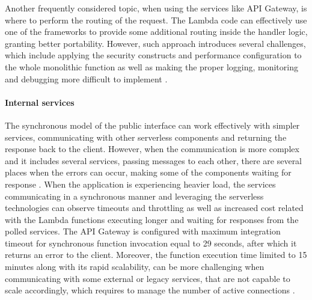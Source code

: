 Another frequently considered topic, when using the services like API Gateway, is where to perform the routing of the request.
The Lambda code can effectively use one of the frameworks to provide some additional routing inside the handler logic, granting better portability.
However, such approach introduces several challenges, which include applying the security constructs and performance configuration to the whole monolithic function as well as making the proper logging, monitoring and debugging more difficult to implement \cite{AWSReinventBuildingMicroservicesWithAWSLambda}.

\paragraph{Internal services} \label{chapter:interal-services}

The synchronous model of the public interface can work effectively with simpler services, communicating with other serverless components and returning the response back to the client.
However, when the communication is more complex and it includes several services, passing messages to each other, there are several places when the errors can occur, making some of the components waiting for response \cite{AWSReinventBuildingMicroservicesWithAWSLambda}.
When the application is experiencing heavier load, the services communicating in a synchronous manner and leveraging the serverless technologies can observe timeouts and throttling as well as increased cost related with the Lambda functions executing longer and waiting for responses from the polled services.
The API Gateway is configured with maximum integration timeout for synchronous function invocation equal to 29 seconds, after which it returns an error to the client.
Moreover, the function execution time limited to 15 minutes along with its rapid scalability, can be more challenging when communicating with some external or legacy services, that are not capable to scale accordingly, which requires to manage the number of active connections \cite{ServerlessAtScaleDesignPatternsAndOptimizations}.

